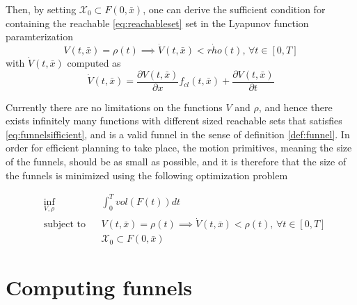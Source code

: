 Then, by setting \(\mathcal{X}_0 \subset F(0,\bar{x})\), one can derive the
sufficient condition for containing the reachable \ref{eq:reachableset} set in
the Lyapunov function paramterization
\begin{equation}
  V(t,\bar{x}) = \rho(t) \implies \dot{V}(t,\bar{x}) < \dot{rho}(t), \, \forall t \in [0,T]
\end{equation}
with \(\dot{V}(t,\bar{x})\) computed as
\begin{equation}
  \label{eq:funnelsufficient}
  \dot{V}(t,\bar{x}) = \frac{\partial V(t,\bar{x})}{\partial x} f_{cl}(t,\bar{x}) + \frac{\partial V(t,\bar{x})}{\partial t}
\end{equation}

Currently there are no limitations on the functions \(V\) and \(\rho\), and
hence there exists infinitely many functions with different sized reachable sets
that satisfies \ref{eq:funnelsifficient}, and is a valid funnel in the sense of
definition \ref{def:funnel}. In order for efficient planning to take place, the
motion primitives, meaning the size of the funnels, should be as small as
possible, and it is therefore that the size of the funnels is minimized using
the following optimization problem \cite{majumdarFunnelLibrariesRealtime2017}

\begin{align}
  &\underset{V,\rho}{\text{inf}} \; &&\int_{0}^{T} vol(F(t)) dt  \\
  &\text{subject to} && V(t,\bar{x}) = \rho (t) \implies \dot{V}(t,\bar{x}) < \rho (t), \, \forall t \in [0,T] \\
  && &\mathcal{X}_0 \subset F(0,\bar{x})
\end{align} 


\section{Computing funnels}

